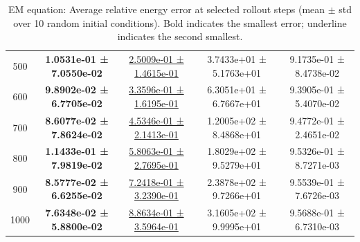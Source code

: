 \documentclass{article}
\theoremstyle{plain}
\theoremstyle{definition}
\theoremstyle{remark}
\begin{document}
\begin{table}[htbp]
\begin{tabular}{ccccc}
500 & \textbf{1.0531e-01 ± 7.0550e-02} & \underline{2.5009e-01 ± 1.4615e-01} & 3.7433e+01 ± 5.1763e+01 & 9.1735e-01 ± 8.4738e-02 \\
600 & \textbf{9.8902e-02 ± 6.7705e-02} & \underline{3.3596e-01 ± 1.6195e-01} & 6.3051e+01 ± 6.7667e+01 & 9.3905e-01 ± 5.4070e-02 \\
700 & \textbf{8.6077e-02 ± 7.8624e-02} & \underline{4.5346e-01 ± 2.1413e-01} & 1.2005e+02 ± 8.4868e+01 & 9.4772e-01 ± 2.4651e-02 \\
800 & \textbf{1.1433e-01 ± 7.9819e-02} & \underline{5.8063e-01 ± 2.7695e-01} & 1.8029e+02 ± 9.5279e+01 & 9.5326e-01 ± 8.7271e-03 \\
900 & \textbf{8.5777e-02 ± 6.6255e-02} & \underline{7.2418e-01 ± 3.2390e-01} & 2.3878e+02 ± 9.7266e+01 & 9.5539e-01 ± 7.6726e-03 \\
1000& \textbf{7.6348e-02 ± 5.8800e-02} & \underline{8.8634e-01 ± 3.5964e-01} & 3.1605e+02 ± 9.9995e+01 & 9.5688e-01 ± 6.7310e-03 \\
\hline
\end{tabular}
\caption{EM equation: Average relative energy error at selected rollout steps
(mean $\pm$ std over 10 random initial conditions).
Bold indicates the smallest error; underline indicates the second smallest.}
\label{tab:em-energy_errors_time_rows}
\end{table}
\end{document}
